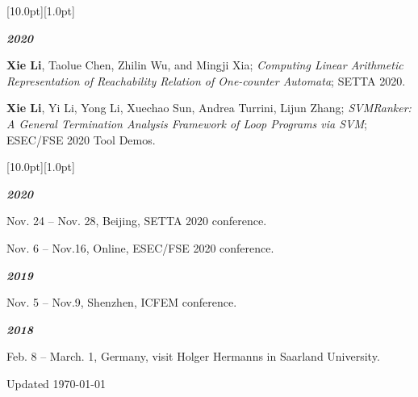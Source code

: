 \documentclass[12pt,a4paper,utf8]{report}
\begin{document}
\begin{minipage}[t]{16cm}
    \colorbox{subtitlecolor}{\raisebox{0pt}[10.0pt][1.0pt]{
        \textcolor{white}{\textsf{}}}}
\end{minipage}\par
\vspace{0.2cm}\hspace{0.5cm}
\begin{minipage}[t]{15cm}
    {\textbf{\em{2020}}}\par
    \quad \textbf{Xie Li}, Taolue Chen, Zhilin Wu, and Mingji Xia;{\em{ Computing Linear Arithmetic Representation of Reachability Relation of One-counter Automata}}; SETTA 2020.\par
    \vspace{0.2cm}
    \quad \textbf{Xie Li}, Yi Li, Yong Li, Xuechao Sun, Andrea Turrini, Lijun Zhang;{\em{ SVMRanker: A General Termination Analysis Framework of Loop Programs via SVM}}; ESEC/FSE 2020 Tool Demos.\par
\end{minipage}\par
\vspace{0.4cm}

\begin{minipage}[t]{16cm}
    \colorbox{subtitlecolor}{\raisebox{0pt}[10.0pt][1.0pt]{
        \textcolor{white}{\textsf{}}}}
\end{minipage}\par
\vspace{0.2cm}\hspace{0.5cm}
\begin{minipage}[t]{15cm}
{\textbf{\em{2020}}}\par
	\quad Nov. 24 -- Nov. 28, Beijing, SETTA 2020 conference.\par
    \quad Nov. 6 -- Nov.16, Online, ESEC/FSE 2020 conference.\par
    \vspace{0.2cm}
{\textbf{\em{2019}}}\par
    \quad Nov. 5 -- Nov.9, Shenzhen, ICFEM conference.\par
    \vspace{0.2cm}
    {\textbf{\em{2018}}}\par
    \quad Feb. 8 -- March. 1, Germany, visit Holger Hermanns in Saarland University.\par
    \vspace{0.2cm}
\end{minipage}\par
\vspace{0.4cm}

\vspace{0.2cm}\hspace{0.5cm}

\begin{center}\vspace{1.0cm}
    Updated \monthyeardate\today
\end{center}
\end{document}
